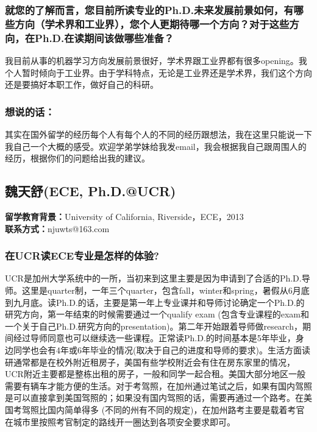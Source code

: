 \documentclass[a4paper,UTF8]{book}
\begin{document}
    \subsubsection*{就您的了解而言，您目前所读专业的Ph.D.未来发展前景如何，有哪些方向（学术界和工业界），您个人更期待哪一个方向？对于这些方向，在Ph.D.在读期间该做哪些准备？}
    我目前从事的机器学习方向发展前景很好，学术界跟工业界都有很多opening。我个人暂时倾向于工业界。由于学科特点，无论是工业界还是学术界，我们这个方向还是要搞好本职工作，做好自己的科研。
                    
    \subsubsection{想说的话：}
    其实在国外留学的经历每个人有每个人的不同的经历跟想法，我在这里只能说一下我自己一个大概的感受。欢迎学弟学妹给我发email，我会根据我自己跟周围人的经历，根据你们的问题给出我的建议。



\clearpage
\subsection{魏天舒(ECE, Ph.D.@UCR)}
    \textbf{留学教育背景：}University of California, Riverside，ECE，2013\\
    \textbf{联系方式：}njuwts@163.com

    \subsubsection*{在UCR读ECE专业是怎样的体验?}
    UCR是加州大学系统中的一所，当初来到这里主要是因为申请到了合适的Ph.D.导师。这里是quarter制，一年三个quarter，包含fall，winter和spring，暑假从6月底到九月底。读Ph.D.的话，主要是第一年上专业课并和导师讨论确定一个Ph.D.的研究方向，第一年结束的时候需要通过一个qualify exam (包含专业课程的exam和一个关于自己Ph.D.研究方向的presentation)。第二年开始跟着导师做research，期间经过导师同意也可以继续选一些课程。正常读Ph.D.的时间基本是5年毕业，身边同学也会有4年或6年毕业的情况(取决于自己的进度和导师的要求)。生活方面读研通常都是在校外附近租房子，美国有些学校附近会有住在房东家里的情况，UCR附近主要都是整栋出租的房子，一般和同学一起合租。美国大部分地区一般需要有辆车才能方便的生活。对于考驾照，在加州通过笔试之后，如果有国内驾照是可以直接拿到美国驾照的；如果没有国内驾照的话，需要再通过一个路考。在美国考驾照比国内简单得多 (不同的州有不同的规定)，在加州路考主要是载着考官在城市里按照考官制定的路线开一圈达到各项安全要求即可。
\end{document}
